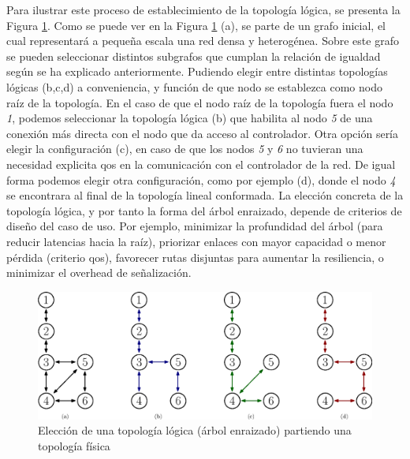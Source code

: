 Para ilustrar este proceso de establecimiento de la topología lógica, se presenta la Figura \ref{fig:topo_logic_1}. Como se puede ver en la Figura \ref{fig:topo_logic_1} (a), se parte de un grafo inicial, el cual representará a pequeña escala una red densa y heterogénea. Sobre este grafo se pueden seleccionar distintos subgrafos que cumplan la relación de igualdad según se ha explicado anteriormente. Pudiendo elegir entre distintas topologías lógicas (b,c,d) a conveniencia, y función de que nodo se establezca como nodo raíz de la topología. En el caso de que el nodo raíz de la topología fuera el nodo \textit{1}, podemos seleccionar la topología lógica (b) que habilita al nodo \textit{5} de una conexión más directa con el nodo que da acceso al controlador. Otra opción sería elegir la configuración (c), en caso de que los nodos \textit{5} y \textit{6} no tuvieran una necesidad explicita \gls{qos} en la comunicación con el controlador de la red.  De igual forma podemos elegir otra configuración, como por ejemplo (d), donde el nodo \textit{4} se encontrara al final de la topología lineal conformada. La elección concreta de la topología lógica, y por tanto la forma del árbol enraizado, depende de criterios de diseño del caso de uso. Por ejemplo, minimizar la profundidad del árbol (para reducir latencias hacia la raíz), priorizar enlaces con mayor capacidad o menor pérdida (criterio \gls{qos}), favorecer rutas disjuntas para aumentar la resiliencia, o minimizar el overhead de señalización. 

\begin{figure}[ht!]
   \centering
   \includegraphics[width=\textwidth]{fig/02_sota/sota_7_topo_logic_1.eps}
   \caption{Elección de una topología lógica (árbol enraizado) partiendo una topología física}
   \label{fig:topo_logic_1}
\end{figure}


